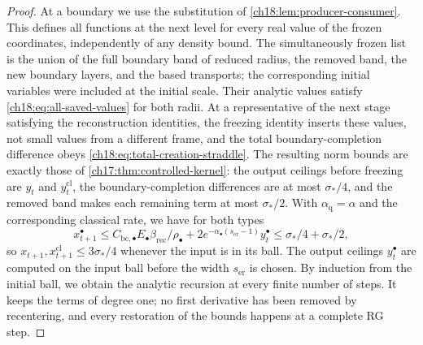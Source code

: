 \begin{proof}
At a boundary we use the substitution of \cref{ch18:lem:producer-consumer}. This defines all functions at the next level for every real value of the frozen coordinates, independently of any density bound. The simultaneously frozen list is the union of the full boundary band of reduced radius, the removed band, the new boundary layers, and the based transports; the corresponding initial variables were included at the initial scale. Their analytic values satisfy \eqref{ch18:eq:all-saved-values} for both radii. At a representative of the next stage satisfying the reconstruction identities, the freezing identity inserts these values, not small values from a different frame, and the total boundary-completion difference obeys \eqref{ch18:eq:total-creation-straddle}. The resulting norm bounds are exactly those of \cref{ch17:thm:controlled-kernel}: the output ceilings before freezing are $y_t$ and $y_t^{\mathrm{cl}}$, the boundary-completion differences are at most $\sigma_*/4$, and the removed band makes each remaining term at most $\sigma_*/2$. With $\alpha_{\mathrm q}=\alpha$ and the corresponding classical rate, we have for both types
\[
 x_{t+1}^{\bullet}
 \le C_{\mathrm{bc},\bullet}E_\bullet
               \beta_{\mathrm{rec}}/\rho_\bullet
       +2e^{-\alpha_\bullet(s_{\mathrm{er}}-1)}y_t^\bullet
 \le\sigma_*/4+\sigma_*/2,
\]
so $x_{t+1},x_{t+1}^{\mathrm{cl}}\le3\sigma_*/4$ whenever the input is in its ball. The output ceilings $y_t^\bullet$ are computed on the input ball before the width $s_{\mathrm{er}}$ is chosen. By induction from the initial ball, we obtain the analytic recursion at every finite number of steps. It keeps the terms of degree one; no first derivative has been removed by recentering, and every restoration of the bounds happens at a complete RG step.


\end{proof}
